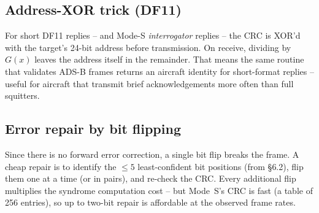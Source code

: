 \documentclass[11pt,a4paper]{article}
\begin{document}
\begin{center}
\end{center}

\subsection{Address-XOR trick (DF11)}

For short DF11 replies -- and Mode-S \emph{interrogator} replies -- the
CRC is XOR'd with the target's 24-bit address before transmission.
On receive, dividing by $G(x)$ leaves the address itself in the
remainder.  That means the same routine that validates ADS-B frames
returns an aircraft identity for short-format replies -- useful for
aircraft that transmit brief acknowledgements more often than full
squitters.

\subsection{Error repair by bit flipping}\label{sec:crc-repair}

Since there is no forward error correction, a single bit flip breaks
the frame.  A cheap repair is to identify the $\leq 5$ least-confident
bit positions (from \S{6.2}), flip them one at a time (or in pairs),
and re-check the CRC.  Every additional flip multiplies the syndrome
computation cost -- but Mode~S's CRC is fast (a table of 256 entries),
so up to two-bit repair is affordable at the observed frame rates.
\end{document}
